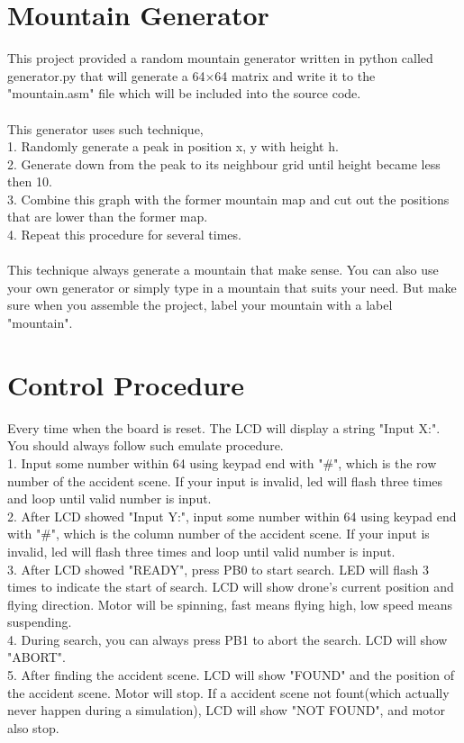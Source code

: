 \documentclass[a4paper, 12 pt]{report}
\begin{document}
\section{Mountain Generator}
This project provided a random mountain generator written in python called generator.py that will generate a 64$\times$64 matrix and write it to the "mountain.asm" file which will be included into the source code.\\\\
This generator uses such technique,\\
1. Randomly generate a peak in position x, y with height h.\\
2. Generate down from the peak to its neighbour grid until height became less then 10.\\
3. Combine this graph with the former mountain map and cut out the positions that are lower than the former map.\\
4. Repeat this procedure for several times.\\\\
This technique always generate a mountain that make sense. You can also use your own generator or simply type in a mountain that suits your need. But make sure when you assemble the project, label your mountain with a label "mountain".
\newpage
\section{Control Procedure}
Every time when the board is reset. The LCD will display a string "Input X:".\\
You should always follow such emulate procedure.\\
1. Input some number within 64 using keypad end with "\#", which is the row number of the accident scene. If your input is invalid, led will flash three times and loop until valid number is input.\\
2. After LCD showed "Input Y:", input some number within 64 using keypad end with "\#", which is the column number of the accident scene. If your input is invalid, led will flash three times and loop until valid number is input.\\
3. After LCD showed "READY", press PB0 to start search. LED will flash 3 times to indicate the start of search. LCD will show drone's current position and flying direction. Motor will be spinning, fast means flying high, low speed means suspending.\\
4. During search, you can always press PB1 to abort the search. LCD will show "ABORT".\\
5. After finding the accident scene. LCD will show "FOUND" and the position of the accident scene. Motor will stop. If a accident scene not fount(which actually never happen during a simulation), LCD will show "NOT FOUND", and motor also stop.
\end{document}
